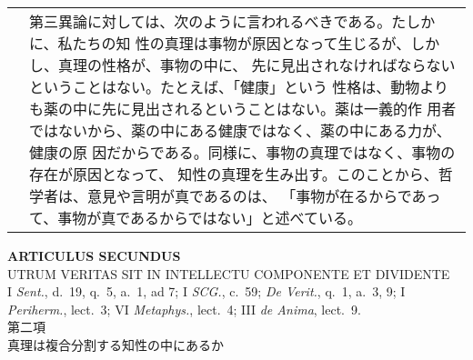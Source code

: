 \documentclass[10pt]{jsarticle} %
\begin{document}
\begin{longtable}{p{21em}p{21em}}
&

第三異論に対しては、次のように言われるべきである。たしかに、私たちの知
性の真理は事物が原因となって生じるが、しかし、真理の性格が、事物の中に、
先に見出されなければならないということはない。たとえば、「健康」という
性格は、動物よりも薬の中に先に見出されるということはない。薬は一義的作
用者ではないから、薬の中にある健康ではなく、薬の中にある力が、健康の原
因だからである。同様に、事物の真理ではなく、事物の存在が原因となって、
知性の真理を生み出す。このことから、哲学者は、意見や言明が真であるのは、
「事物が在るからであって、事物が真であるからではない」と述べている。
\end{longtable}
\newpage


\begin{center}
 {\Large {\bf ARTICULUS SECUNDUS}}\\
 {\large UTRUM VERITAS SIT IN INTELLECTU COMPONENTE ET DIVIDENTE}\\
 {\footnotesize I {\itshape Sent.}, d.~19, q.~5, a.~1, ad 7; I {\itshape
 SCG.}, c.~59; {\itshape De Verit.}, q.~1, a.~3, 9; I {\itshape
 Periherm.}, lect.~3; VI {\itshape Metaphys.}, lect.~4; III {\itshape de
 Anima}, lect.~9.}\\
 {\Large 第二項\\真理は複合分割する知性の中にあるか}
\end{center}
\end{document}
